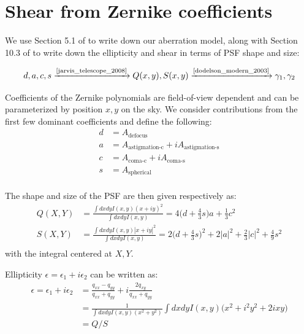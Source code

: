 \section{Shear from Zernike coefficients} \label{sec:ell_zernike} 

We use Section 5.1 of \cite{jarvis_telescope_2008} to write down our aberration model, along with Section 10.3 of \cite{dodelson_modern_2003} to write down the ellipticity and shear in terms of PSF shape and size: 

\begin{equation}
d, a, c, s \xrightarrow{\text{\cite{jarvis_telescope_2008}}} Q(x, y), S(x, y) \xrightarrow{\text{\cite{dodelson_modern_2003}}} \gamma_1, \gamma_2
\end{equation}

Coefficients of the Zernike polynomials are field-of-view dependent and can be parameterized by position $x, y$ on the sky. We consider contributions from the first few dominant coefficients and define the following:
\begin{align}
d &= A_\text{defocus} \\
a &= A_\text{astigmation-c} + i A_\text{astigmation-s} \\
c &= A_\text{coma-c} + i A_\text{coma-s} \\
s &= A_\text{spherical} \\
\end{align}

The shape and size of the PSF are then given respectively as:
\begin{align}
Q(X, Y) &= \frac{\int dx dy I(x, y) (x+iy)^2}{\int dx dy I(x, y)} = 4 \Big(d+\frac{4}{3}s \Big) a + \frac{1}{3} c^2\\
S(X, Y) &= \frac{\int dx dy I(x, y) |x+iy|^2}{\int dx dy I(x, y)} = 2 \Big(d+\frac{4}{3}s \Big)^2 + 2 |a|^2 + \frac{2}{3} |c|^2 + \frac{4}{9} s^2\\
\end{align}
with the integral centered at $X, Y$. 

Ellipticity $\epsilon = \epsilon_1 + i \epsilon_2$ can be written as:
\begin{align}
\epsilon = \epsilon_1 + i \epsilon_2 &= \frac{q_{xx} - q_{yy}}{q_{xx} + q_{yy}} + i \frac{2 q_{xy}}{q_{xx} + q_{yy}}\\
&= \frac{1}{\int dx dy I(x, y) (x^2 + y^2)} \int dx dy I(x, y) \Big( x^2 + i^2 y^2 + 2ixy \Big) \\
&= Q \Big/ S
\end{align}


